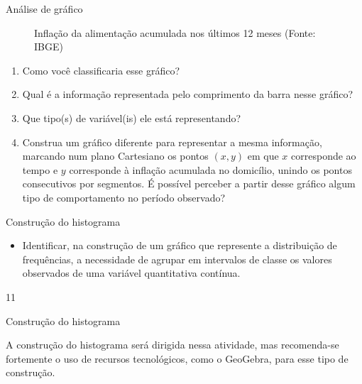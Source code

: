 {\begin{task}{ Análise de gráfico}
\begin{figure}[H]
\caption{Inflação da alimentação acumulada nos últimos 12 meses (Fonte: IBGE)}
\label{est1-fig-8}
\end{figure}

\begin{enumerate}
\item {} 
Como você classificaria esse gráfico?

\item {} 
Qual é a informação representada pelo comprimento da barra nesse gráfico?

\item {} 
Que tipo(s) de variável(is) ele está representando?

\item {} 
Construa um gráfico diferente para representar a mesma informação, marcando num plano Cartesiano os pontos $(x,y)$ em que $x$ corresponde ao tempo e $y$ corresponde à inflação acumulada no domicílio, unindo os pontos consecutivos por segmentos. É possível perceber a partir desse gráfico algum tipo de comportamento no período observado?

\end{enumerate}


\end{task}

\cleardoublepage
\def\currentcolor{session1}
\begin{objectives}{Construção do histograma}
{
\begin{itemize}
\item Identificar, na construção de um gráfico que represente a distribuição de frequências, a necessidade de agrupar em intervalos de classe os valores observados de uma variável quantitativa contínua.
\end{itemize}
}{1}{1}
\end{objectives}
\begin{sugestions}{Construção do histograma}
{
A construção do histograma será dirigida nessa atividade, mas recomenda-se fortemente o uso de recursos tecnológicos, como o GeoGebra, para esse tipo de construção.

}
\end{sugestions}}
